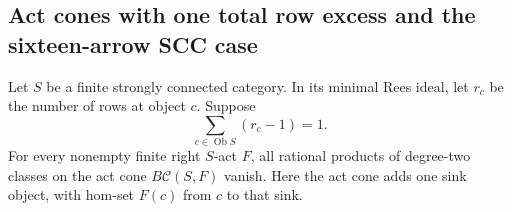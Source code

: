 \subsection{Act cones with one total row excess and the sixteen-arrow SCC case}

\begin{theorem}
\label{C:one-row-excess-act-cups}
Let $S$ be a finite strongly connected category.  In its minimal
Rees ideal, let $r_c$ be the number of rows at object $c$.
Suppose
\[
 \sum_{c\in\operatorname{Ob}S}(r_c-1)=1.
\]
For every nonempty finite right $S$-act $F$, all rational
products of degree-two classes on the act cone
$B\mathcal C(S,F)$ vanish.  Here the act cone adds one sink
object, with hom-set $F(c)$ from $c$ to that sink.
\end{theorem}
